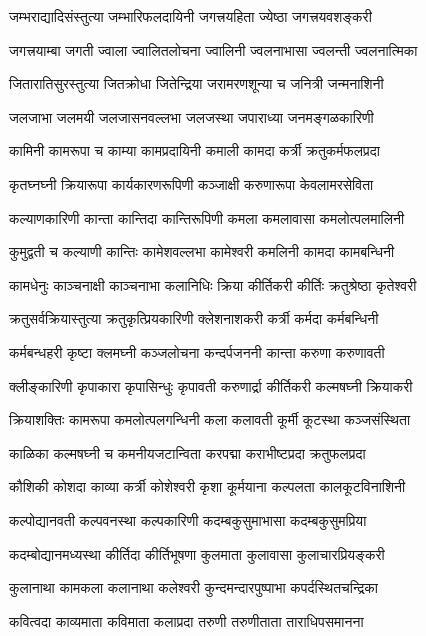 \twolineshloka
{जम्भराद्यादिसंस्तुत्या जम्भारिफलदायिनी}
{जगत्त्रयहिता ज्येष्ठा जगत्त्रयवशङ्करी}%

\twolineshloka
{जगत्त्रयाम्बा जगती ज्वाला ज्वालितलोचना}
{ज्वालिनी ज्वलनाभासा ज्वलन्ती ज्वलनात्मिका}%

\twolineshloka
{जितारातिसुरस्तुत्या जितक्रोधा जितेन्द्रिया}
{जरामरणशून्या च जनित्री जन्मनाशिनी}%

\twolineshloka
{जलजाभा जलमयी जलजासनवल्लभा}
{जलजस्था जपाराध्या जनमङ्गळकारिणी}%

\twolineshloka
{कामिनी कामरूपा च काम्या कामप्रदायिनी}
{कमाली कामदा कर्त्री क्रतुकर्मफलप्रदा}%

\twolineshloka
{कृतघ्नघ्नी क्रियारूपा कार्यकारणरूपिणी}
{कञ्जाक्षी करुणारूपा केवलामरसेविता}%

\twolineshloka
{कल्याणकारिणी कान्ता कान्तिदा कान्तिरूपिणी}
{कमला कमलावासा कमलोत्पलमालिनी}%

\twolineshloka
{कुमुद्वती च कल्याणी कान्तिः कामेशवल्लभा}
{कामेश्वरी कमलिनी कामदा कामबन्धिनी}%

\twolineshloka
{कामधेनुः काञ्चनाक्षी काञ्चनाभा कलानिधिः}
{क्रिया कीर्तिकरी कीर्तिः क्रतुश्रेष्ठा कृतेश्वरी}%

\twolineshloka
{क्रतुसर्वक्रियास्तुत्या क्रतुकृत्प्रियकारिणी}
{क्लेशनाशकरी कर्त्री कर्मदा कर्मबन्धिनी}%

\twolineshloka
{कर्मबन्धहरी कृष्टा क्लमघ्नी कञ्जलोचना}
{कन्दर्पजननी कान्ता करुणा करुणावती}%

\twolineshloka
{क्लीङ्कारिणी कृपाकारा कृपासिन्धुः कृपावती}
{करुणार्द्रा कीर्तिकरी कल्मषघ्नी क्रियाकरी}%

\twolineshloka
{क्रियाशक्तिः कामरूपा कमलोत्पलगन्धिनी}
{कला कलावती कूर्मी कूटस्था कञ्जसंस्थिता}%

\twolineshloka
{काळिका कल्मषघ्नी च कमनीयजटान्विता}
{करपद्मा कराभीष्टप्रदा क्रतुफलप्रदा}%

\twolineshloka
{कौशिकी कोशदा काव्या कर्त्री कोशेश्वरी कृशा}
{कूर्मयाना कल्पलता कालकूटविनाशिनी}%

\twolineshloka
{कल्पोद्यानवती कल्पवनस्था कल्पकारिणी}
{कदम्बकुसुमाभासा कदम्बकुसुमप्रिया}%

\twolineshloka
{कदम्बोद्यानमध्यस्था कीर्तिदा कीर्तिभूषणा}
{कुलमाता कुलावासा कुलाचारप्रियङ्करी}%

\twolineshloka
{कुलानाथा कामकला कलानाथा कलेश्वरी}
{कुन्दमन्दारपुष्पाभा कपर्दस्थितचन्द्रिका}%

\twolineshloka
{कवित्वदा काव्यमाता कविमाता कलाप्रदा}
{तरुणी तरुणीताता ताराधिपसमानना}%

